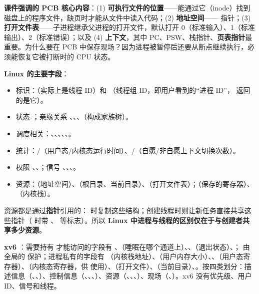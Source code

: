 \textbf{课件强调的 PCB 核心内容}：(1) \textbf{可执行文件的位置}——能通过它（inode）找到磁盘上的程序文件，缺页时才能从文件中读入代码；(2) \textbf{地址空间}—— 指针；(3) \textbf{打开文件表}——子进程继承父进程的打开文件，默认打开 0（标准输入）、1（标准输出）、2（标准错误）；以及 (4) \textbf{上下文}，其中 PC、PSW、栈指针、\textbf{页表指针}最重要。为什么要在 PCB 中保存现场？因为进程被暂停后还要从断点继续执行，必须能恢复它被打断时的 CPU 状态。

\textbf{Linux  的主要字段}：
\begin{itemize}
    \item 标识：（实际上是线程 ID）和 （线程组 ID，即用户看到的“进程 ID”， 返回的是它）。
    \item 状态 ；亲缘关系 、、、（构成家族树）。
    \item 调度相关：、、、、、。
    \item 统计：/（用户态/内核态运行时间）、/（自愿/非自愿上下文切换次数）。
    \item 权限 、、；信号 、、、。
    \item 资源：\textbf{}（地址空间）、\textbf{}（根目录、当前目录）、\textbf{}（打开文件表）；（保存的寄存器）、（内核栈）。
\end{itemize}
资源都是通过\textbf{指针}引用的： 时复制这些结构；创建线程时则让新任务直接共享这些指针（ 时带 、 等标志）。所以 \textbf{Linux 中进程与线程的区别仅在于与创建者共享多少资源}。

\textbf{xv6 }：需要持有  才能访问的字段有 、（睡眠在哪个通道上）、、（退出状态）、； 由全局的  保护；进程私有的字段有 （内核栈地址）、（用户内存大小）、、（用户态寄存器）、（内核态寄存器，供  使用）、（打开文件）、（当前目录）、。按四类划分：描述信息（、、）、控制信息（、、、）、资源（、、、）、现场（、）。xv6 没有优先级、用户 ID、信号和线程。

